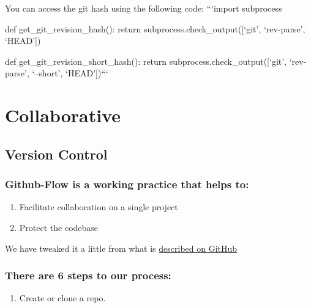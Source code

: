 \documentclass[]{book}
\providecommand{\tightlist}{%
  \setlength{\itemsep}{0pt}\setlength{\parskip}{0pt}}
\begin{document}
You can access the git hash using the following code:
```import subprocess

def get\_git\_revision\_hash():
return subprocess.check\_output({[}`git', `rev-parse', `HEAD'{]})

def get\_git\_revision\_short\_hash():
return subprocess.check\_output({[}`git', `rev-parse', `--short', `HEAD'{]})```

\hypertarget{collaborate}{%
\section{Collaborative}\label{collaborate}}

\hypertarget{versioncontrol}{%
\subsection{Version Control}\label{versioncontrol}}

\hypertarget{github-flow-is-a-working-practice-that-helps-to}{%
\subsubsection*{Github-Flow is a working practice that helps to:}\label{github-flow-is-a-working-practice-that-helps-to}}

\begin{enumerate}
\def\labelenumi{\arabic{enumi}.}
\setcounter{enumi}{1}
\tightlist
\item
  Facilitate collaboration on a single project
\item
  Protect the codebase
\end{enumerate}

We have tweaked it a little from what is \href{https://guides.github.com/introduction/flow/}{described on GitHub}

\hypertarget{there-are-6-steps-to-our-process}{%
\subsubsection*{There are 6 steps to our process:}\label{there-are-6-steps-to-our-process}}

\begin{enumerate}
\def\labelenumi{\arabic{enumi}.}
\tightlist
\item
  Create or clone a repo.
\end{enumerate}
\end{document}
